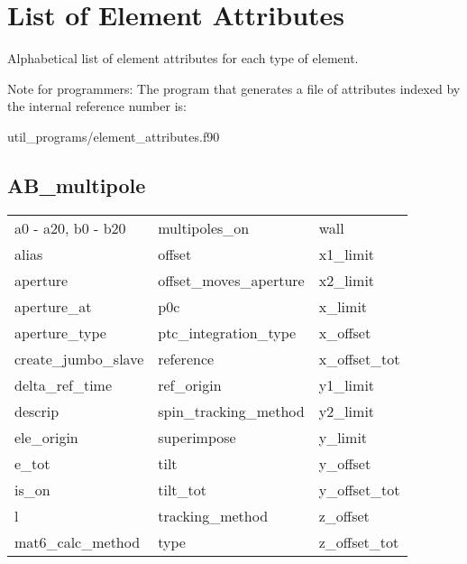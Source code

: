 \chapter{List of Element Attributes}
\label{c:attrib.list}

Alphabetical list of element attributes for each type of element. 

Note for programmers: The program that generates a file of attributes indexed by the
internal reference number is:
\begin{example}
  util_programs/element_attributes.f90 
\end{example}

 \section{AB_multipole}
 \label{s:list.ab.multipole}
 
 \begin{tabular}{lll} \toprule
a0 - a20, b0 - b20          & multipoles_on               & wall                        \\
alias                       & offset                      & x1_limit                    \\
aperture                    & offset_moves_aperture       & x2_limit                    \\
aperture_at                 & p0c                         & x_limit                     \\
aperture_type               & ptc_integration_type        & x_offset                    \\
create_jumbo_slave          & reference                   & x_offset_tot                \\
delta_ref_time              & ref_origin                  & y1_limit                    \\
descrip                     & spin_tracking_method        & y2_limit                    \\
ele_origin                  & superimpose                 & y_limit                     \\
e_tot                       & tilt                        & y_offset                    \\
is_on                       & tilt_tot                    & y_offset_tot                \\
l                           & tracking_method             & z_offset                    \\
mat6_calc_method            & type                        & z_offset_tot                \\
 \bottomrule
 \end{tabular}
 \vfill
 
